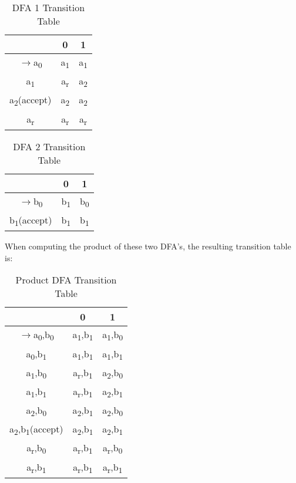 \documentclass[conference]{IEEEtran}
\begin{document}
\begin{table}[h!]
\centering
\caption{DFA 1 Transition Table}
\begin{tabular}{|c|c|c|}
\hline
 & 0 & 1 \\
\hline
$\rightarrow$a\textsubscript{0} & a\textsubscript{1} & a\textsubscript{1} \\
\hline
a\textsubscript{1} & a\textsubscript{r} & a\textsubscript{2} \\
\hline
a\textsubscript{2}(accept) & a\textsubscript{2} & a\textsubscript{2} \\
\hline
a\textsubscript{r} & a\textsubscript{r} & a\textsubscript{r} \\
\hline
\end{tabular}
\label{table:dfa1}
\end{table}
\begin{table}[h!]
\centering
\caption{DFA 2 Transition Table}
\begin{tabular}{|c|c|c|}
\hline
 & 0 & 1 \\
\hline
$\rightarrow$b\textsubscript{0} & b\textsubscript{1} & b\textsubscript{0} \\
\hline
b\textsubscript{1}(accept) & b\textsubscript{1} & b\textsubscript{1} \\
\hline
\end{tabular}
\label{table:dfa1}
\end{table}
When computing the product of these two DFA's, the resulting transition table is:
\begin{table}[h]
\caption{Product DFA Transition Table}
\centering
\begin{tabular}{|c|c|c|}
\hline
 & 0 & 1 \\
\hline
$\rightarrow$a\textsubscript{0},b\textsubscript{0} & a\textsubscript{1},b\textsubscript{1} & a\textsubscript{1},b\textsubscript{0} \\
\hline
a\textsubscript{0},b\textsubscript{1} & a\textsubscript{1},b\textsubscript{1} & a\textsubscript{1},b\textsubscript{1} \\
\hline
a\textsubscript{1},b\textsubscript{0} & a\textsubscript{r},b\textsubscript{1} & a\textsubscript{2},b\textsubscript{0} \\
\hline
a\textsubscript{1},b\textsubscript{1} & a\textsubscript{r},b\textsubscript{1} & a\textsubscript{2},b\textsubscript{1} \\
\hline
a\textsubscript{2},b\textsubscript{0} & a\textsubscript{2},b\textsubscript{1} & a\textsubscript{2},b\textsubscript{0} \\
\hline
a\textsubscript{2},b\textsubscript{1}(accept) & a\textsubscript{2},b\textsubscript{1} & a\textsubscript{2},b\textsubscript{1} \\
\hline
a\textsubscript{r},b\textsubscript{0} & a\textsubscript{r},b\textsubscript{1} & a\textsubscript{r},b\textsubscript{0} \\
\hline
a\textsubscript{r},b\textsubscript{1} & a\textsubscript{r},b\textsubscript{1} & a\textsubscript{r},b\textsubscript{1} \\
\hline
\end{tabular}
\label{table:dfa1}
\end{table} \\
\end{document}
